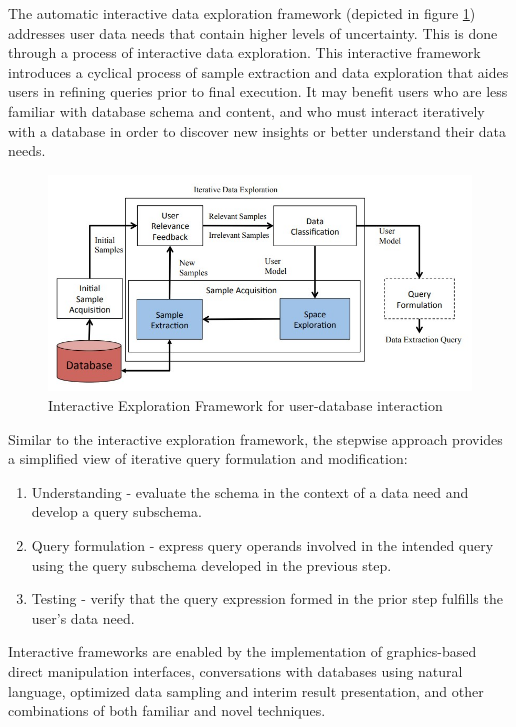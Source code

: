 The automatic interactive data exploration framework (depicted in figure \ref{fig:interactive_framework}) addresses user data needs that contain higher levels of uncertainty. This is done through a process of interactive data exploration. 
\cite{10.1145/2588555.2610523} This interactive framework introduces a cyclical process of sample extraction and data exploration that aides users in refining queries prior to final execution. 
It may benefit users who are less familiar with database schema and content, and who must interact iteratively with a database in order to discover new insights or better understand their data needs.

\begin{figure}
  \includegraphics[width=\linewidth]{figures/explore_by_example_figure_1.jpg}
  \caption{Interactive Exploration Framework for user-database interaction \cite{10.1145/2588555.2610523}}
  \label{fig:interactive_framework}
\end{figure}

Similar to the interactive exploration framework, the stepwise approach \cite{10.5555/647248.719775} provides a simplified view of iterative query formulation and modification:

\begin{enumerate}
  \item Understanding - evaluate the schema in the context of a data need and develop a query subschema.
  \item Query formulation - express query operands involved in the intended query using the query subschema developed in the previous step.
  \item Testing - verify that the query expression formed in the prior step fulfills the user's data need.
\end{enumerate}

Interactive frameworks are enabled by the implementation of graphics-based direct manipulation interfaces, conversations with databases using natural language, optimized data sampling and interim result presentation, and other combinations of both familiar and novel techniques.

